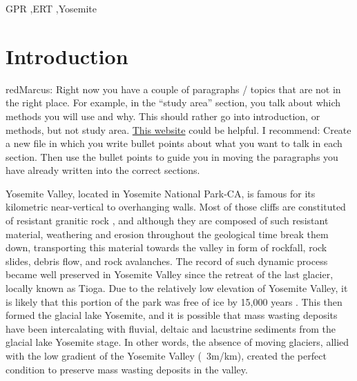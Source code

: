 \documentclass[5p]{elsarticle}
\newcommand{\alon}{\begin{color}{red}}
\newcommand{\aloff}{\end{color}}
\begin{document}
\begin{frontmatter}
\begin{abstract}
									\end{abstract}

					\begin{keyword}
GPR \sep ERT \sep Yosemite
					\end{keyword}

	\end{frontmatter}


\section{Introduction}

\alon Marcus: Right now you have a couple of paragraphs / topics that are not in the right place. For example, in the ``study area'' section, you talk about which methods you will use and why. This should rather go into introduction, or methods, but not study area.  \href{https://www.elsevier.com/connect/11-steps-to-structuring-a-science-paper-editors-will-take-seriously}{This website} could be helpful. I recommend: Create a new file in which you write bullet points about what you want to talk in each section. Then use the bullet points to guide you in moving the paragraphs you have already written into the correct sections.\aloff


Yosemite Valley, located in Yosemite National Park-CA, is famous for its kilometric near-vertical to overhanging walls. Most of those cliffs are constituted of resistant granitic rock \citep{bateman1992plutonism}, and although they are composed of such resistant material, weathering and erosion throughout the geological time break them down, transporting this material towards the valley in form of rockfall, rock slides, debris flow, and rock avalanches. The record of such dynamic process became well preserved in Yosemite Valley since the retreat of the last glacier, locally known as Tioga. Due to the relatively low elevation of Yosemite Valley, it is likely that this portion of the park was free of ice by 15,000 years \citep{Wieczorek+1996}. This then formed the glacial lake Yosemite, and it is possible that mass wasting deposits have been intercalating with fluvial, deltaic and lacustrine sediments from the glacial lake Yosemite stage.   In other words, the absence of moving glaciers, allied with the low gradient of the Yosemite Valley (~3m/km), created the perfect condition to preserve mass wasting deposits in the valley. 
\end{document}
